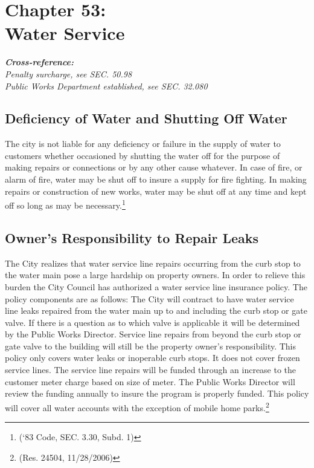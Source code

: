 \chapter*{Chapter 53: \\
	Water Service}
    \minitoc
    \textbf{\emph{{Cross-reference:}}}\\
    \indent\emph{Penalty surcharge, see SEC. 50.98}\\
    \indent\emph{Public Works Department established, see SEC. 32.080}
    \pagebreak

\section{Deficiency of Water and Shutting Off Water}
The city is not liable for any deficiency or failure in the supply of water to customers whether occasioned by shutting the water off for the purpose of making repairs or connections or by any other cause whatever.  In case of fire, or alarm of fire, water may be shut off to insure a supply for fire fighting.  In making repairs or construction of new works, water may be shut off at any time and kept off so long as may be necessary.\footnote{(‘83 Code, SEC. 3.30, Subd. 1)}

\section{Owner's Responsibility to Repair Leaks}
The City realizes that water service line repairs occurring from the curb stop to the water main pose a large hardship on property owners.  In order to relieve this burden the City Council has authorized a water service line insurance policy.  The policy components are as follows:  The City will contract to have water service line leaks repaired from the water main up to and including the curb stop or gate valve.  If there is a question as to which valve is applicable it will be determined by the Public Works Director. Service line repairs from beyond the curb stop or gate valve to the building will still be the property owner’s responsibility.  This policy only covers water leaks or inoperable curb stops.  It does not cover frozen service lines.  The service line repairs will be funded through an increase to the customer meter charge based on size of meter. The Public Works Director will review the funding annually to insure the program is properly funded.  This policy will cover all water accounts with the exception of mobile home parks.\footnote{(Res. 24504, 11/28/2006)}

